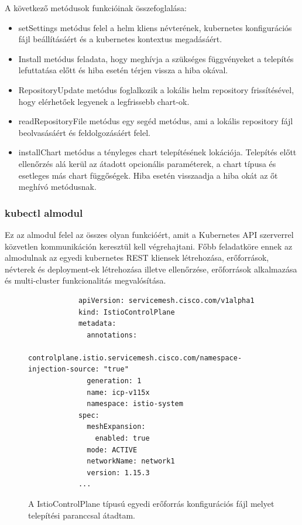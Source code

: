 A következő metódusok funkcióinak összefoglalása:
\begin{itemize}
    \item setSettings metódus felel a helm kliens névterének, kubernetes konfigurációs fájl beállításáért és a kubernetes kontextus megadásáért.
    \item Install metódus feladata, hogy meghívja a szükséges függvényeket a telepítés lefuttatása előtt és hiba esetén térjen vissza a hiba okával.
    \item RepositoryUpdate metódus foglalkozik a lokális helm repository frissítésével, hogy elérhetőek legyenek a legfrissebb chart-ok.
    \item readRepositoryFile metódus egy segéd metódus, ami a lokális repository fájl beolvasásáért és feldolgozásáért felel.
    \item installChart metódus a tényleges chart telepítésének lokációja. Telepítés előtt ellenőrzés alá kerül az átadott opcionális paraméterek, a chart típusa és esetleges más chart függőségek. Hiba esetén visszaadja a hiba okát az őt meghívó metódusnak.
\end{itemize}

\subsubsection*{kubectl almodul}
Ez az almodul felel az összes olyan funkcióért, amit a Kubernetes API szerverrel közvetlen kommunikáción keresztül kell végrehajtani.
Főbb feladatköre ennek az almodulnak az egyedi kubernetes REST kliensek létrehozása, erőforrások, névterek és deployment-ek létrehozása illetve ellenőrzése, erőforrások alkalmazása és multi-cluster funkcionalitás megvalósítása.

\begin{figure}
    \centering
    \begin{minipage}{\linewidth}
        \begin{lstlisting}
            apiVersion: servicemesh.cisco.com/v1alpha1
            kind: IstioControlPlane
            metadata:
              annotations:
                controlplane.istio.servicemesh.cisco.com/namespace-injection-source: "true"
              generation: 1
              name: icp-v115x
              namespace: istio-system
            spec:
              meshExpansion:
                enabled: true
              mode: ACTIVE
              networkName: network1
              version: 1.15.3
            ...
        \end{lstlisting}
    \end{minipage}
    \caption{A IstioControlPlane típusú egyedi erőforrás konfigurációs fájl melyet telepítési paranccsal átadtam.}
      \label{sample-icp-config}
\end{figure}

